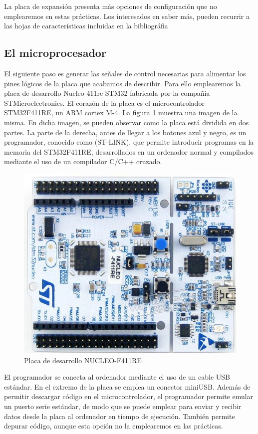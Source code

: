 \documentclass[10pt,a4paper]{report}
\begin{document}
La placa de expansión presenta más opciones de configuración que no emplearemos en estas prácticas. Los interesados en saber más, pueden recurrir a las hojas de características incluidas en la bibliográfia

  
\subsection{El microprocesador} \label{sec_mic}
El siguiente paso es generar las señales de control necesarias para alimentar  los pines lógicos de la placa que acabamos de describir. Para ello emplearemos la placa de desarrollo  Nucleo-411re STM32 fabricada por la compañía STMicroelectronics. El corazón de la placa es el microcontrolador STM32F411RE, un ARM cortex M-4.   
La  figura \ref{f11} muestra una imagen de  la misma. En dicha imagen, se pueden observar como la placa está dividida en dos partes. La parte de la derecha, antes de llegar a los botones azul y negro, es un programador, conocido como (ST-LINK), que permite introducir programas en la memoria del STM32F411RE, desarrollados en un ordenador normal y compilados mediante el uso de un compilador C/C++ cruzado. 
\begin{figure}
\centering
\includegraphics[scale=1.5,angle=180]{NUCLEO-F411RE.jpg}
\caption{Placa de desarrollo NUCLEO-F411RE }\label{f11}
\end{figure}
El programador se conecta al ordenador mediante el uso de un cable USB estándar. En el extremo de la placa se emplea un conector miniUSB. Además de permitir descargar código en el microcontrolador, el programador permite emular un puerto serie estándar, de modo que se puede emplear para enviar y recibir datos desde la placa al ordenador en tiempo de ejecución. También permite depurar código, aunque esta opción no la emplearemos en las prácticas. 
\end{document}
